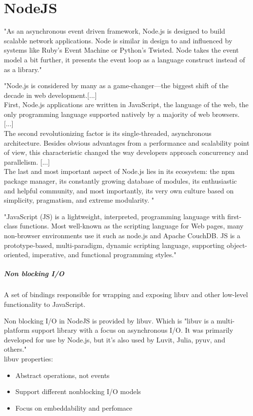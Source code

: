 \chapter{NodeJS}
"As an asynchronous event driven framework, Node.js is designed to build scalable network applications. 
Node is similar in design to and influenced by systems like Ruby's Event Machine or Python's Twisted. 
Node takes the event model a bit further, it presents the event loop as a language construct instead of as a library." \cite{nodejsabout}

"Node.js is considered by many as a game-changer—the biggest shift of the decade in web development.[...]\\
 First, Node.js applications are written in JavaScript, the language of the web, the only programming language supported natively by a majority of web browsers. [...]\\
The second revolutionizing factor is its single-threaded, asynchronous architecture. 
Besides obvious advantages from a performance and scalability point of view, this characteristic changed the way developers approach concurrency and parallelism. [...]\\
The last and most important aspect of Node.js lies in its ecosystem: the npm package manager, its constantly growing database of modules, its enthusiastic and helpful community, and most importantly, its very own culture based on simplicity, pragmatism, and extreme modularity. "\cite{nodejsbook}

"JavaScript (JS) is a lightweight, interpreted, programming language with first-class functions. Most well-known as the scripting language for Web pages, many non-browser environments use it such as node.js and Apache CouchDB. JS is a prototype-based, multi-paradigm, dynamic scripting language, supporting object-oriented, imperative, and functional programming styles."\cite{mozillaJS}

\paragraph{Non blocking I/O}
A set of bindings responsible for wrapping and exposing libuv and other low-level functionality to JavaScript.\cite{nodejsbook}

Non blocking I/O in NodeJS is provided by libuv\cite{nodejsabout}\cite{nodejsbook}. 
Which is "libuv is a multi-platform support library with a focus on asynchronous I/O. It was primarily developed for use by Node.js, but it’s also used by Luvit, Julia, pyuv, and others."\cite{libuv}\\
libuv properties\cite{libuvBasic}:
\begin{itemize}
\item Abstract operations, not events
\item Support different nonblocking I/O models
\item Focus on embeddability and perfomace
\end{itemize}


